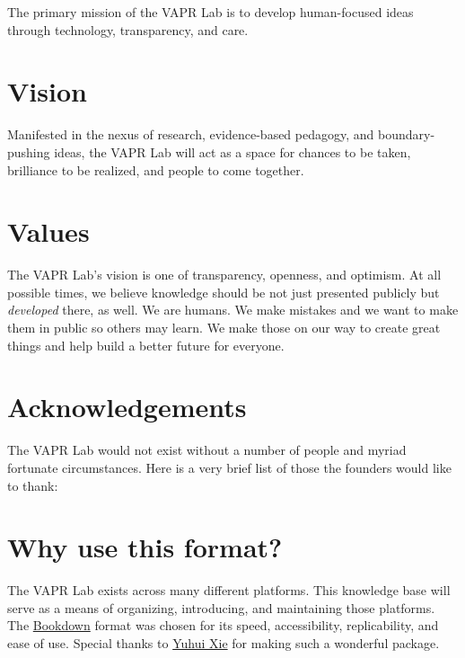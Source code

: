 \documentclass[12pt,]{memoir}
\begin{document}
The primary mission of the VAPR Lab is to develop human-focused ideas through technology, transparency, and care.

\hypertarget{vision}{%
\section*{Vision}\label{vision}}

Manifested in the nexus of research, evidence-based pedagogy, and boundary-pushing ideas, the VAPR Lab will act as a space for chances to be taken, brilliance to be realized, and people to come together.

\hypertarget{values}{%
\section*{Values}\label{values}}

The VAPR Lab's vision is one of transparency, openness, and optimism. At all possible times, we believe knowledge should be not just presented publicly but \emph{developed} there, as well. We are humans. We make mistakes and we want to make them in public so others may learn. We make those on our way to create great things and help build a better future for everyone.

\hypertarget{acknowledgements}{%
\section*{Acknowledgements}\label{acknowledgements}}

The VAPR Lab would not exist without a number of people and myriad fortunate circumstances. Here is a very brief list of those the founders would like to thank:

\hypertarget{why-use-this-format}{%
\section*{Why use this format?}\label{why-use-this-format}}

The VAPR Lab exists across many different platforms. This knowledge base will serve as a means of organizing, introducing, and maintaining those platforms. The \href{https://bookdown.org}{Bookdown} format was chosen for its speed, accessibility, replicability, and ease of use. Special thanks to \href{https://yihui.name/}{Yuhui Xie} for making such a wonderful package.
\end{document}
